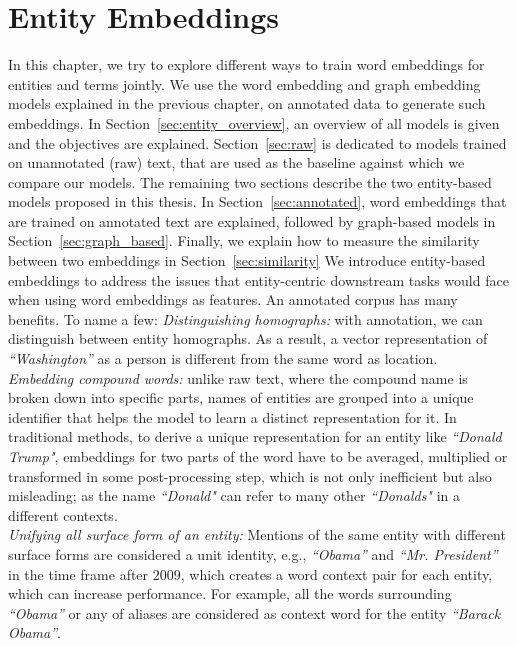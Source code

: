 \chapter{Entity Embeddings}\label{chap:entity}

In this chapter, we try to explore different ways to train word embeddings for entities and terms jointly. We use the word embedding and graph embedding models explained in the previous chapter, on annotated data to generate such embeddings. In Section~\ref{sec:entity_overview}, an overview of all models is given and the objectives are explained. Section~\ref{sec:raw} is dedicated to models trained on unannotated (raw) text, that are used as the baseline against which we compare our models. The remaining two sections describe the two entity-based models proposed in this thesis. In Section~\ref{sec:annotated},  word embeddings that are trained on annotated text are explained, followed by graph-based models in Section~\ref{sec:graph_based}. Finally, we explain how to measure the similarity between two embeddings in Section~\ref{sec:similarity}
\ornament
We introduce entity-based embeddings to address the issues that entity-centric downstream tasks would face when using word embeddings as features. An annotated corpus has many benefits. To name a few: 
\emph{Distinguishing homographs:} with annotation, we can distinguish between entity homographs. As a result, a vector representation of \emph{``Washington''} as a person is different from the same word as location. \\
\emph{Embedding compound words:}  unlike raw text, where the compound name is broken down into specific parts, names of entities are grouped into a unique identifier that helps the model to learn a distinct representation for it.  In traditional methods, to derive a unique representation for an entity like \emph{``Donald Trump"}, embeddings for two parts of the word have to be averaged, multiplied or transformed in some post-processing step, which is not only inefficient but also misleading; as the name \emph{``Donald"} can refer to many other \emph{``Donalds"} in a different contexts. \\
\emph{Unifying all surface form of an entity:} Mentions of the same entity with different surface forms are considered a unit identity, e.g., \emph{``Obama''} and \emph{``Mr. President''} in the time frame after $2009$, which creates a word context pair for each entity, which can increase performance. For example, all the words surrounding \emph{``Obama''} or any of aliases are considered as context word for the entity \emph{``Barack Obama''}. \\
